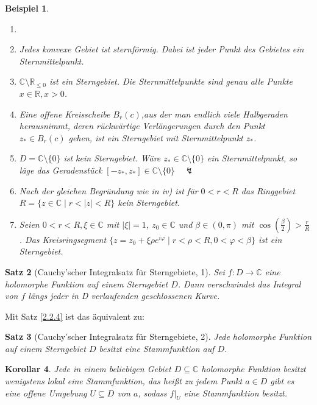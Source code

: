 \documentclass[a4paper,12pt]{book}
\theoremstyle{newthm}
\newtheorem{thm}{Satz}[section]
\newtheorem{cor}[thm]{Korollar}
\theoremstyle{newdef}
\theoremstyle{newrem}
\newtheorem{exmp}[thm]{Beispiel}
\newcommand{\R}{\mathbb{R}}
\newcommand{\C}{\mathbb{C}}
\newcommand{\bound}[2]{\left.#1\right|_{#2}}
\begin{document}
		\begin{exmp}
			\begin{enumerate}[label = {\roman*})]
				\item[]
				\item Jedes konvexe Gebiet ist sternförmig. Dabei ist jeder Punkt des Gebietes ein Sternmittelpunkt.
				\item $ \C \setminus \R_{\leq 0} $ ist ein Sterngebiet. Die Sternmittelpunkte sind genau alle Punkte $ x \in \R, x > 0 $.
				\item Eine offene Kreisscheibe $ B_r(c) $,aus der man endlich viele Halbgeraden herausnimmt, deren rückwärtige Verlängerungen durch den Punkt $z_* \in B_r(c)$ gehen, ist ein Sterngebiet mit Sternmittelpunkt $z_*$.
				\item $ D = \C \setminus \{0\} $ ist \emph{kein} Sterngebiet. Wäre $ z_* \in \C \setminus\{0\} $ ein Sternmittelpunkt, so läge das Geradenstück $ [-z_*,z_*] \in \C \setminus \{0\} \quad \lightning $
				\item Nach der gleichen Begründung wie in iv) ist für $ 0<r<R $ das Ringgebiet $ R = \{ z \in \C \mid r < |z| < R \} $ kein Sterngebiet.
				\item Seien $ 0<r<R, \xi \in \C $ mit $ |\xi|=1 $, $z_0 \in \C$ und $ \beta \in (0,\pi) $ mit $ \cos\left(\frac{\beta}{2}\right) > \frac{r}{R} $. Das Kreisringsegment $ \{ z = z_0 + \xi\rho e^{i\varphi} \mid r<\rho<R, 0<\varphi<\beta \} $ ist ein Sterngebiet.
			\end{enumerate}
		\end{exmp}
		
		\begin{thm}[Cauchy'scher Integralsatz für Sterngebiete, 1]
			Sei $ f: D \to \C $ eine holomorphe Funktion auf einem Sterngebiet $D$. Dann verschwindet das Integral von $f$ längs jeder in D verlaufenden geschlossenen Kurve.
		\end{thm}
		
		Mit Satz \ref{2.2.4} ist das äquivalent zu:
		
		\begin{thm}[Cauchy'scher Integralsatz für Sterngebiete, 2]\label{2.2.8}
			Jede holomorphe Funktion auf einem Sterngebiet $D$ besitzt eine Stammfunktion auf $D$.
		\end{thm}
		
		\begin{cor}
			Jede in einem beliebigen Gebiet $ D \subseteq \C $ holomorphe Funktion besitzt wenigstens lokal eine Stammfunktion, das heißt zu jedem Punkt $ a \in D $ gibt es eine offene Umgebung $ U \subseteq D $ von $a$, sodass $ \bound{f}{U} $ eine Stammfunktion besitzt.
		\end{cor}
		
\end{document}
